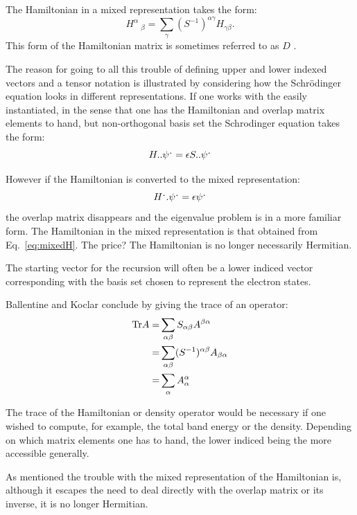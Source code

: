 The Hamiltonian in a mixed representation takes the form:
%
\begin{equation}
\label{eq:mixedH}
H^{\alpha}\ _{\beta} = \sum_{\gamma}(S^{-1})^{\alpha\gamma}H_{\gamma\beta}.
\end{equation}
%
This form of the Hamiltonian matrix is sometimes referred to as $D$ \cite{weeks73}.

The reason for going to all this trouble of defining upper and lower
indexed vectors and a tensor notation is illustrated by considering how the Schr\"odinger
equation looks in different representations. If one works with
the easily instantiated, in the sense that one has the Hamiltonian and
overlap matrix elements to hand, but non-orthogonal basis set the Schrodinger
equation takes the form:
%
\begin{equation}
H..\psi^{\mbox{\large .}}=\epsilon S..\psi^{\mbox{\large .}}
\end{equation}
%

However if the Hamiltonian is converted to the mixed representation:
%
\begin{equation}
H^{\mbox{\large .}}.\psi^{\mbox{\large .}}=\epsilon\psi^{\mbox{\large .}}
\end{equation}
%
the overlap matrix disappears and the eigenvalue problem is in a 
more familiar form. The Hamiltonian in the mixed representation 
is that obtained from Eq.~\ref{eq:mixedH}. The price? The Hamiltonian
is no longer necessarily Hermitian.

The starting vector for the recursion will often be a lower indiced
vector corresponding with the basis set chosen to represent the electron
states.

Ballentine and Koclar conclude by giving the trace of an operator:
\begin{align}
{\rm Tr}A =& \sum_{\alpha\beta}S_{\alpha\beta}A^{\beta\alpha}\\
          =& \sum_{\alpha\beta}(S^{-1})^{\alpha\beta}A_{\beta\alpha} \\
          =& \sum_{\alpha}A^{\alpha}_{\alpha}
\end{align}

The trace of the Hamiltonian or density operator would be necessary 
if one wished to compute, for example, the total band energy 
or the density. Depending on which matrix elements one has to hand, 
the lower indiced being the more accessible generally. 

As mentioned the trouble with the mixed representation of the Hamiltonian is,
although it escapes the need to deal directly with the overlap 
matrix or its inverse, it is no longer Hermitian. 

